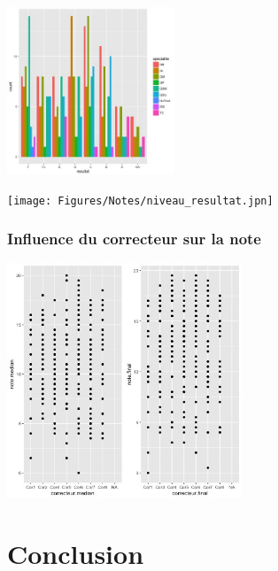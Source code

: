 \documentclass[]{report}
\begin{document}
	\begin{center}
	\includegraphics[width=50mm]{Figures/Notes/specialite_resultat.jpg}
	\label{fig:specialite_resultat}
	\end{center}


		\begin{center}
		\texttt{[image: Figures/Notes/niveau\_resultat.jpn]}
		\label{fig:niveau_resultat}
		\end{center}

\subsubsection{Influence du correcteur sur la note}

	\begin{center}
	\includegraphics[width=70mm]{Figures/Notes/correcteur.jpg}
	\label{fig:scatter_correcteur_median}
\end{center}

\section{Conclusion}
\end{document}

